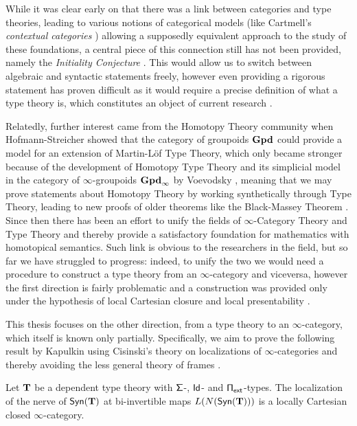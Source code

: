 \noindent
While it was clear early on that there was a link between categories and type
theories, leading to various notions of categorical models (like
Cartmell's \emph{contextual categories} \cite{Car78}) allowing a supposedly
equivalent approach to the study of these foundations, a central piece of this
connection still has not been provided, namely the \emph{Initiality Conjecture}
\cite{Str91}.
This would allow us to switch between algebraic and syntactic statements freely,
however even providing a rigorous statement has proven difficult as it would
require a precise definition of what a type theory is, which constitutes an
object of current research \cite{BHL20}.

\noindent
Relatedly, further interest came from the Homotopy Theory community when
Hofmann-Streicher \cite{HS98} showed that the category of groupoids $\operatorname{\mathbf{Gpd}}$ could
provide a model for an extension of Martin-L{\"o}f Type Theory, which only
became stronger because of the development of Homotopy Type Theory and its
simplicial model in the category of $\infty$-groupoids $\operatorname{\mathbf{Gpd}_\infty}$ by
Voevodsky \cite{KL12}, meaning that we may prove statements about Homotopy
Theory by working synthetically through Type Theory, leading to new proofs of
older theorems like the Black-Massey Theorem \cite{HFLL16}. Since then there has
been an effort to unify the
fields of $\infty$-Category Theory and Type Theory and thereby provide a
satisfactory foundation for mathematics with homotopical semantics. Such link is
obvious to the researchers in the field, but so far we have struggled to
progress: indeed, to unify the two we would need a procedure to construct a type
theory from an $\infty$-category and viceversa, however the first direction is
fairly problematic and a construction was provided only under the hypothesis of
local Cartesian closure and local presentability \cite{Shu14}.

\noindent
This thesis focuses on the other direction, from a type theory to an
$\infty$-category, which itself is known only partially. Specifically, we aim to
prove the following result by Kapulkin \cite[Thm.\ 9.3.17]{Kap14} using
Cisinski's theory on localizations of $\infty$-categories \cite{Cis19} and
thereby avoiding the less general theory of frames \cite{Szu14,KS15}.

\begin{finalthm}
  Let $\operatorname{\mathbf{T}}$ be a dependent type theory with $\operatorname{\mathsf{\Sigma}}$-, $\operatorname{\mathsf{Id}}$- and
  $\operatorname{\mathsf{\Pi_{ext}}}$-types. The localization of the nerve of $\mathsf{Syn}(\mathbf{T})$ at bi-invertible
  maps $L(N(\mathsf{Syn}(\mathbf{T})))$ is a locally Cartesian closed $\infty$-category.
\end{finalthm}


